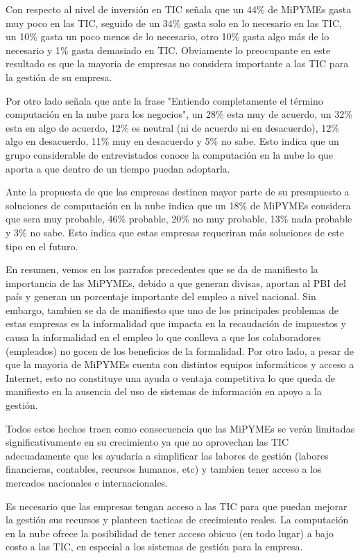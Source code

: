 Con respecto al nivel de inversión en TIC \cite{ipsos} señala que un 44\% de MiPYMEs
gasta muy poco en las TIC, seguido de un 34\% gasta solo en lo necesario en las TIC,
un 10\% gasta un poco menos de lo necesario, otro 10\% gasta algo más de lo necesario y
1\% gasta demasiado en TIC. Obviamente lo preocupante en este resultado es que la
mayoria de empresas no considera importante a las TIC para la gestión de su empresa.

Por otro lado \cite{ipsos} señala que ante la frase "Entiendo completamente el
término computación en la nube para los negocios", un 28\% esta muy de acuerdo, un 32\%
esta en algo de acuerdo, 12\% es neutral (ni de acuerdo ni en desacuerdo), 12\%
algo en desacuerdo, 11\% muy en desacuerdo y 5\% no sabe. Esto indica que un grupo
considerable de entrevistados conoce la computación en la nube lo que aporta a que
dentro de un tiempo puedan adoptarla.

Ante la propuesta de que las empresas destinen mayor parte de su presupuesto a
soluciones de computación en la nube \cite{ipsos} indica que un 18\% de MiPYMEs
considera que sera muy probable, 46\% probable, 20\% no muy probable, 13\% nada
probable y 3\% no sabe. Esto indica que estas empresas requeriran más soluciones
de este tipo en el futuro.

En resumen, vemos en los parrafos precedentes que se da de manifiesto la importancia
de las MiPYMEs, debido a que generan divisas, aportan al PBI del país y generan
un porcentaje importante del empleo a nivel nacional. Sin embargo, tambien se da
de manifiesto que uno de los principales problemas de estas empresas es la informalidad
que impacta en la recaudación de impuestos y causa la informalidad en el empleo
lo que conlleva a que los colaboradores (empleados) no gocen de los beneficios de la formalidad.
Por otro lado, a pesar de que la mayoria de MiPYMEs cuenta con distintos equipos
informáticos y acceso a Internet, esto no constituye una ayuda o ventaja competitiva
lo que queda de manifiesto en la ausencia del uso de sistemas de información en
apoyo a la gestión.

Todos estos hechos traen como consecuencia que las MiPYMEs se verán limitadas
significativamente en su crecimiento ya que no aprovechan las TIC adecuadamente
que les ayudaria a simplificar las labores de gestión (labores financieras, contables,
recursos humanos, etc) y tambien tener acceso a los mercados nacionales e internacionales.

Es necesario que las empresas tengan acceso a las TIC para que puedan mejorar la
gestión sus recursos y planteen tacticas de crecimiento reales. La computación
en la nube ofrece la posibilidad de tener acceso obicuo (en todo lugar) a bajo
costo a las TIC, en especial a los sistemas de gestión para la empresa.

